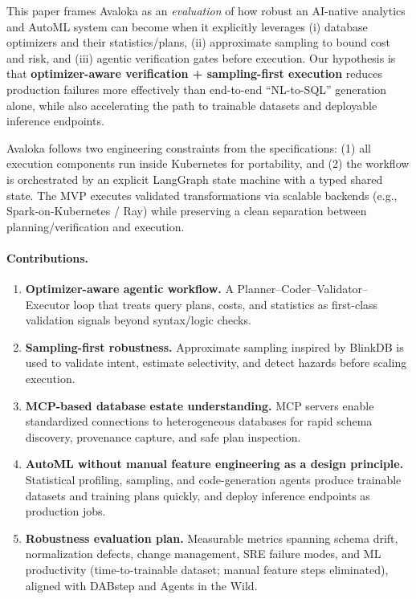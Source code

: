 \documentclass{article} %
\begin{document}
This paper frames Avaloka as an \emph{ evaluation} of how robust an AI-native analytics and AutoML
system can become when it explicitly leverages (i) database optimizers and their statistics/plans,
(ii) approximate sampling to bound cost and risk, and (iii) agentic verification gates before
execution. Our hypothesis is that \textbf{optimizer-aware verification + sampling-first execution}
reduces production failures more effectively than end-to-end ``NL-to-SQL'' generation alone, while
also accelerating the path to trainable datasets and deployable inference endpoints.

Avaloka follows two engineering constraints from the specifications: (1) all execution components
run inside Kubernetes for portability, and (2) the workflow is orchestrated by an explicit LangGraph
state machine with a typed shared state. The MVP executes
validated transformations via scalable backends (e.g., Spark-on-Kubernetes / Ray) while preserving a
clean separation between planning/verification and execution.

\paragraph{Contributions.}
\begin{enumerate}
  \item \textbf{Optimizer-aware agentic workflow.} A Planner--Coder--Validator--Executor loop that treats
  query plans, costs, and statistics as first-class validation signals beyond syntax/logic checks.
  \item \textbf{Sampling-first robustness.} Approximate sampling inspired by BlinkDB is used to validate
  intent, estimate selectivity, and detect hazards before scaling execution.
  \item \textbf{MCP-based database estate understanding.} MCP servers enable standardized connections to
  heterogeneous databases for rapid schema discovery, provenance capture, and safe plan inspection.
  \item \textbf{AutoML without manual feature engineering as a design principle.} Statistical profiling,
  sampling, and code-generation agents produce trainable datasets and training plans quickly, and deploy
  inference endpoints as production jobs.
  \item \textbf{Robustness evaluation plan.} Measurable metrics spanning schema drift, normalization defects,
  change management, SRE failure modes, and ML productivity (time-to-trainable dataset; manual feature steps
  eliminated), aligned with DABstep and Agents in the Wild.
\end{enumerate}
\end{document}
